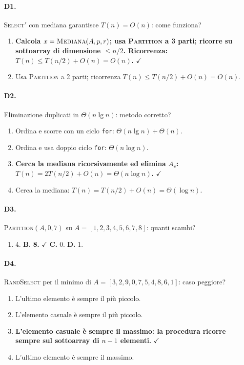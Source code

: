 \paragraph{D1.} \textsc{Select}$'$ con mediana garantisce $T(n)=O(n)$: come funziona?
\begin{enumerate}[label=\Alph*.,leftmargin=*]
	\item \textcolor{correctgreen}{\textbf{Calcola $x=\textsc{Mediana}(A,p,r)$; usa \textsc{Partition} a 3 parti; ricorre su sottoarray di dimensione $\le n/2$. Ricorrenza: $T(n)\le T(n/2)+O(n)=O(n)$.}} \hfill\textcolor{correctgreen}{$\checkmark$}
	\item Usa \textsc{Partition} a 2 parti; ricorrenza $T(n)\le T(n/2)+O(n)=O(n)$.
\end{enumerate}

\paragraph{D2.} Eliminazione duplicati in $\Theta(n\lg n)$: metodo corretto?
\begin{enumerate}[label=\Alph*.,leftmargin=*]
	\item Ordina e scorre con un ciclo \texttt{for}: $\Theta(n\lg n)+\Theta(n)$.
	\item Ordina e usa doppio ciclo \texttt{for}: $\Theta(n\log n)$.
	\item \textcolor{correctgreen}{\textbf{Cerca la mediana ricorsivamente ed elimina $A_v$: $T(n)=2T(n/2)+O(n)=\Theta(n\log n)$.}} \hfill\textcolor{correctgreen}{$\checkmark$}
	\item Cerca la mediana: $T(n)=T(n/2)+O(n)=\Theta(\log n)$.
\end{enumerate}

\paragraph{D3.} \textsc{Partition}$(A,0,7)$ su $A=[1,2,3,4,5,6,7,8]$: quanti scambi?
\begin{enumerate}[label=\Alph*.,leftmargin=*]
	\item 4. \quad\textbf{B.} \textcolor{correctgreen}{\textbf{8.}} \hfill\textcolor{correctgreen}{$\checkmark$} \quad\textbf{C.} 0. \quad\textbf{D.} 1.
\end{enumerate}

\paragraph{D4.} \textsc{RandSelect} per il minimo di $A=[3,2,9,0,7,5,4,8,6,1]$: caso peggiore?
\begin{enumerate}[label=\Alph*.,leftmargin=*]
	\item L'ultimo elemento \`e sempre il pi\`u piccolo.
	\item L'elemento casuale \`e sempre il pi\`u piccolo.
	\item \textcolor{correctgreen}{\textbf{L'elemento casuale \`e sempre il massimo: la procedura ricorre sempre sul sottoarray di $n-1$ elementi.}} \hfill\textcolor{correctgreen}{$\checkmark$}
	\item L'ultimo elemento \`e sempre il massimo.
\end{enumerate}

